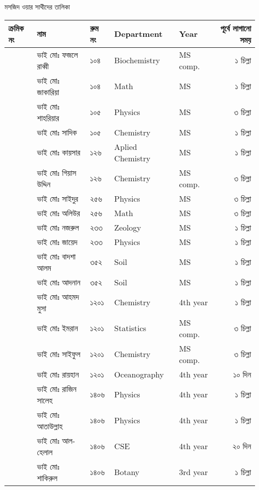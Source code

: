 \documentclass{article}
\newcounter{magicrownumbers}
\newcommand\rownumber{\stepcounter{magicrownumbers}\arabic{magicrownumbers}}
\begin{document}
\begin{center}
মসজিদ ওয়ার সাথীদের তালিকা
\end{center}
\noindent
\centering
\noindent
  \begin{tabular}{@{}lll
>{\selectlanguage{english}}l
>{\selectlanguage{english}}l
    r@{}}
\toprule
ক্রমিক নং &  নাম &  রুম নং &  Department & Year & পূর্বে লাগানো সময়\\
\toprule
\rownumber & ভাই মোঃ ফজলে রাব্বী  & ১০৪ & Biochemistry & MS comp. & ১ চিল্লা\\ 
\rownumber & ভাই মোঃ জাকারিয়া & ১০৪ & Math & MS & ১ চিল্লা\\
\rownumber & ভাই মোঃ শাহরিয়ার & ১০৫ & Physics & MS & ৩ চিল্লা\\
\rownumber & ভাই মোঃ সাদিক & ১০৫ & Chemistry & MS & ১ চিল্লা\\
\rownumber & ভাই মোঃ কায়সার & ১২৬ & Aplied Chemistry & MS & ১ চিল্লা\\ 
\rownumber & ভাই মোঃ গিয়াস উদ্দিন  & ১২৬ & Chemistry & MS comp. & ৩ চিল্লা\\ 
\rownumber & ভাই মোঃ সাইদুর & ২৫৬ & Physics & MS & ৩ চিল্লা\\ 
\rownumber & ভাই মোঃ অলিউর & ২৫৬ & Math & MS & ৩ চিল্লা\\ 
\rownumber & ভাই মোঃ নজরুল  & ২৩৩ & Zeology & MS & ১ চিল্লা\\ 
\rownumber & ভাই মোঃ জায়েদ & ২৩৩ & Physics & MS & ১ চিল্লা\\ 
\rownumber & ভাই মোঃ বাদশা আলম & ৩৫২ & Soil & MS & ১ চিল্লা\\
\rownumber & ভাই মোঃ আদনান & ৩৫২ & Soil & MS & ১ চিল্লা\\
\rownumber & ভাই মোঃ আহমদ মুসা & ১২০১ & Chemistry & 4th year & ১ চিল্লা\\ 
\rownumber & ভাই মোঃ ইমরান & ১২০১ & Statistics & MS comp. & ৩ চিল্লা\\ 
\rownumber & ভাই মোঃ সাইফুল & ১২০১ & Chemistry & MS comp. & ৩ চিল্লা\\ 
\rownumber & ভাই মোঃ রায়হান  & ১২০১ & Oceanography & 4th year & ১০ দিন\\
\rownumber & ভাই মোঃ রাজিন সালেহ & ১৪০৬ & Physics & 4th year & ১ চিল্লা\\ 
\rownumber & ভাই মোঃ আতাউল্লাহ & ১৪০৬ & Physics & 4th year & ১ চিল্লা\\  
\rownumber & ভাই মোঃ আল-হেলাল & ১৪০৬ & CSE & 4th year & ২০ দিন\\
\rownumber & ভাই মোঃ শাকিরুল & ১৪০৬ & Botany & 3rd year & ১ চিল্লা\\ 

\end{tabular}
\end{document}
